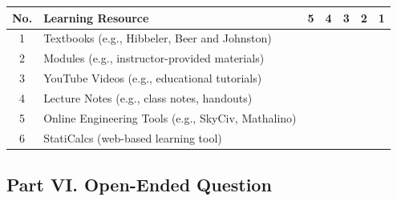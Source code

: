 \begin{tabular}{c p{7cm} c c c c c}
\hline
\textbf{No.} & \textbf{Learning Resource} & \textbf{5} & \textbf{4} & \textbf{3} & \textbf{2} & \textbf{1} \\
\hline
1 & Textbooks (e.g., Hibbeler, Beer and Johnston) & \fbox{\rule{0pt}{0.2cm}\rule{0.2cm}{0pt}} & \fbox{\rule{0pt}{0.2cm}\rule{0.2cm}{0pt}} & \fbox{\rule{0pt}{0.2cm}\rule{0.2cm}{0pt}} & \fbox{\rule{0pt}{0.2cm}\rule{0.2cm}{0pt}} & \fbox{\rule{0pt}{0.2cm}\rule{0.2cm}{0pt}} \\

2 & Modules (e.g., instructor-provided materials) & \fbox{\rule{0pt}{0.2cm}\rule{0.2cm}{0pt}} & \fbox{\rule{0pt}{0.2cm}\rule{0.2cm}{0pt}} & \fbox{\rule{0pt}{0.2cm}\rule{0.2cm}{0pt}} & \fbox{\rule{0pt}{0.2cm}\rule{0.2cm}{0pt}} & \fbox{\rule{0pt}{0.2cm}\rule{0.2cm}{0pt}} \\

3 & YouTube Videos (e.g., educational tutorials) & \fbox{\rule{0pt}{0.2cm}\rule{0.2cm}{0pt}} & \fbox{\rule{0pt}{0.2cm}\rule{0.2cm}{0pt}} & \fbox{\rule{0pt}{0.2cm}\rule{0.2cm}{0pt}} & \fbox{\rule{0pt}{0.2cm}\rule{0.2cm}{0pt}} & \fbox{\rule{0pt}{0.2cm}\rule{0.2cm}{0pt}} \\

4 & Lecture Notes (e.g., class notes, handouts) & \fbox{\rule{0pt}{0.2cm}\rule{0.2cm}{0pt}} & \fbox{\rule{0pt}{0.2cm}\rule{0.2cm}{0pt}} & \fbox{\rule{0pt}{0.2cm}\rule{0.2cm}{0pt}} & \fbox{\rule{0pt}{0.2cm}\rule{0.2cm}{0pt}} & \fbox{\rule{0pt}{0.2cm}\rule{0.2cm}{0pt}} \\

5 & Online Engineering Tools (e.g., SkyCiv, Mathalino) & \fbox{\rule{0pt}{0.2cm}\rule{0.2cm}{0pt}} & \fbox{\rule{0pt}{0.2cm}\rule{0.2cm}{0pt}} & \fbox{\rule{0pt}{0.2cm}\rule{0.2cm}{0pt}} & \fbox{\rule{0pt}{0.2cm}\rule{0.2cm}{0pt}} & \fbox{\rule{0pt}{0.2cm}\rule{0.2cm}{0pt}} \\

6 & StatiCalcs (web-based learning tool) & \fbox{\rule{0pt}{0.2cm}\rule{0.2cm}{0pt}} & \fbox{\rule{0pt}{0.2cm}\rule{0.2cm}{0pt}} & \fbox{\rule{0pt}{0.2cm}\rule{0.2cm}{0pt}} & \fbox{\rule{0pt}{0.2cm}\rule{0.2cm}{0pt}} & \fbox{\rule{0pt}{0.2cm}\rule{0.2cm}{0pt}} \\
\hline
\end{tabular}

\vspace{2cm}
\subsection*{Part VI. Open-Ended Question}

